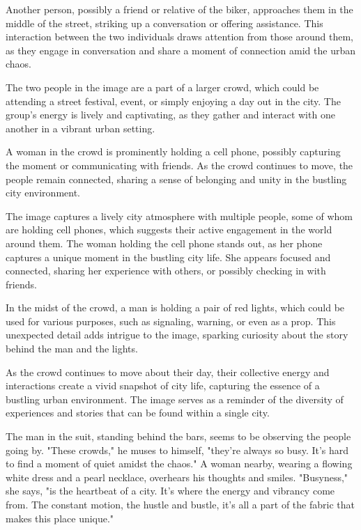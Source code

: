 \documentclass[smalldemyvopaper,11pt,twoside,onecolumn,openright,extrafontsizes]{memoir}
\begin{document}
Another person, possibly a friend or relative of the biker, approaches them in the middle of the street, striking up a conversation or offering assistance. This interaction between the two individuals draws attention from those around them, as they engage in conversation and share a moment of connection amid the urban chaos.\par
The two people in the image are a part of a larger crowd, which could be attending a street festival, event, or simply enjoying a day out in the city. The group's energy is lively and captivating, as they gather and interact with one another in a vibrant urban setting.\par
A woman in the crowd is prominently holding a cell phone, possibly capturing the moment or communicating with friends. As the crowd continues to move, the people remain connected, sharing a sense of belonging and unity in the bustling city environment.\par
The image captures a lively city atmosphere with multiple people, some of whom are holding cell phones, which suggests their active engagement in the world around them. The woman holding the cell phone stands out, as her phone captures a unique moment in the bustling city life. She appears focused and connected, sharing her experience with others, or possibly checking in with friends.\par
In the midst of the crowd, a man is holding a pair of red lights, which could be used for various purposes, such as signaling, warning, or even as a prop. This unexpected detail adds intrigue to the image, sparking curiosity about the story behind the man and the lights.\par
As the crowd continues to move about their day, their collective energy and interactions create a vivid snapshot of city life, capturing the essence of a bustling urban environment. The image serves as a reminder of the diversity of experiences and stories that can be found within a single city.\par
The man in the suit, standing behind the bars, seems to be observing the people going by. "These crowds," he muses to himself, "they're always so busy. It's hard to find a moment of quiet amidst the chaos." A woman nearby, wearing a flowing white dress and a pearl necklace, overhears his thoughts and smiles. "Busyness," she says, "is the heartbeat of a city. It's where the energy and vibrancy come from. The constant motion, the hustle and bustle, it's all a part of the fabric that makes this place unique."\par
\end{document}
